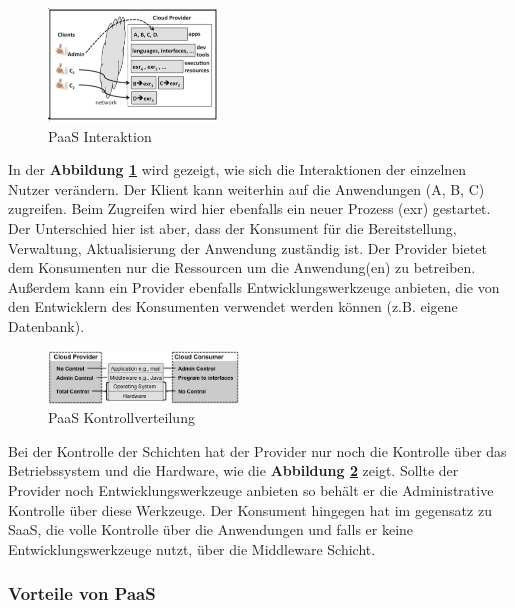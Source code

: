 \begin{figure}[H]
    \centering
	\includegraphics[width=0.4\textwidth]{Images/PaaSInteraction}
	\caption{PaaS Interaktion \cite{Badger}}
	\label{PaaSInteration}
\end{figure}

In der \textbf{Abbildung \ref{PaaSInteration}} wird gezeigt, wie sich die Interaktionen der einzelnen Nutzer verändern.
Der Klient kann weiterhin auf die Anwendungen (A, B, C) zugreifen. Beim Zugreifen wird hier ebenfalls ein neuer Prozess (exr) gestartet. Der Unterschied hier ist aber, dass
der Konsument für die Bereitstellung, Verwaltung, Aktualisierung der Anwendung zuständig ist. Der Provider bietet dem Konsumenten nur die Ressourcen um die Anwendung(en) zu betreiben.
Außerdem kann ein Provider ebenfalls Entwicklungswerkzeuge anbieten, die von den Entwicklern des Konsumenten verwendet werden können (z.B. eigene Datenbank).

\begin{figure}[H]
    \centering
	\includegraphics[width=0.45\textwidth]{Images/PaaSControl}
	\caption{PaaS Kontrollverteilung \cite{Badger}}
	\label{PaaSControl}
\end{figure}

Bei der Kontrolle der Schichten hat der Provider nur noch die Kontrolle über das Betriebssystem und die Hardware, wie die \textbf{Abbildung \ref{PaaSControl}} zeigt.
Sollte der Provider noch Entwicklungswerkzeuge anbieten so behält er die Administrative Kontrolle über diese Werkzeuge. Der Konsument hingegen hat im gegensatz zu SaaS,
die volle Kontrolle über die Anwendungen und falls er keine Entwicklungswerkzeuge nutzt, über die Middleware Schicht.

\subsubsection*{Vorteile von PaaS}

